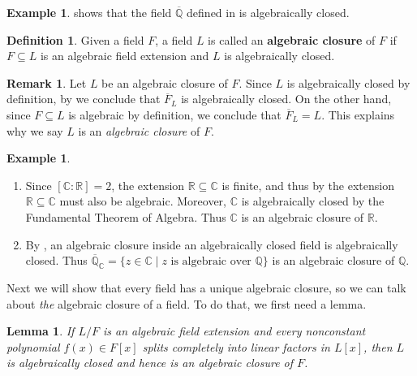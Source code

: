 \documentclass[12pt]{report}
\newtheorem{lemma}[theorem]{Lemma}
\numberwithin{equation}{section}
\numberwithin{theorem}{chapter}
\theoremstyle{definition}
\newtheorem{definition}[theorem]{Definition}
\newtheorem{example}[theorem]{Example}
\newtheorem*{basic properties}{Basic Properties}
\newtheorem*{Important Remark}{Important Remark}
\newtheorem{remark}[theorem]{Remark}
\newcommand{\df}[1]{{\bf #1}\index{#1}}
\newcommand{\C}{\mathbb{C}}
\begin{document}
\begin{example}
	 shows that the field $\overline{\mathbb{Q}}$ defined in  is algebraically closed.
\end{example}




\begin{definition}
Given a field $F$, a field $L$ is called an \df{algebraic closure} of $F$ if $F \subseteq L$ is an algebraic field extension and $L$ is algebraically closed.
\end{definition}

\begin{remark}
	Let $L$ be an algebraic closure of $F$. Since $L$ is algebraically closed by definition, by  we conclude that $\overline{F}_L$ is algebraically closed. On the other hand, since $F \subseteq L$ is algebraic by definition, we conclude that $\overline{F}_L = L$. This explains why we say $L$ is an \emph{algebraic closure} of $F$.
\end{remark}

\begin{example}$\,$
\begin{enumerate}[label=\arabic*),leftmargin=15pt]
\item Since $[\C : \mathbb{R}]=2$, the extension $\mathbb{R} \subseteq \C$ is finite, and thus by  the extension $\mathbb{R} \subseteq \C$ must also be algebraic. Moreover, $\C$ is algebraically closed by the Fundamental Theorem of Algebra. Thus $\C$ is an algebraic closure of $\mathbb{R}$.
\item By , an algebraic closure inside an algebraically closed field is algebraically closed. Thus $\overline{\mathbb{Q}}_\C=\{ z \in \C \mid z \text{ is algebraic over } \mathbb{Q} \}$ is an algebraic closure of $\mathbb{Q}$.
\end{enumerate}
\end{example}


Next we will show that every field has a unique algebraic closure, so we can talk about \emph{the} algebraic closure of a field. To do that, we first need a lemma.

\begin{lemma}\label{lemma for existence and uniqueness of alg closures}
If $L/F$ is an algebraic field extension and every nonconstant polynomial $f(x) \in F[x]$ splits completely into linear factors in $L[x]$, then $L$ is algebraically closed and hence is an algebraic closure of $F$.
\end{lemma}
\end{document}
